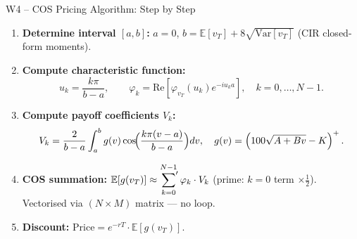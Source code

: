 \documentclass[aspectratio=169, 11pt]{beamer}
\begin{document}
\begin{frame}{W4 -- COS Pricing Algorithm: Step by Step}
\begin{enumerate}
  \item \textbf{Determine interval $[a,b]$:}\;
    $a=0$,\; $b=\mathbb{E}[v_T]+8\sqrt{\mathrm{Var}[v_T]}$ \;(CIR closed-form moments).

  \item \textbf{Compute characteristic function:}
    \[
  u_k=\frac{k\pi}{b-a},
  \qquad
  \varphi_k
  =
  \mathrm{Re}\!\left[
  \varphi_{v_T}(u_k)e^{-iu_ka}
  \right],
  \quad k=0,\dots,N-1.
    \]

  \item \textbf{Compute payoff coefficients $V_k$:}
    \[
      V_k = \frac{2}{b-a}\int_a^b g(v)\cos\!\Bigl(\frac{k\pi(v-a)}{b-a}\Bigr)dv,
      \quad g(v)=\left(100\sqrt{A+Bv}-K\right)^+.
    \]

  \item \textbf{COS summation:}
    $\displaystyle\mathbb{E}[g(v_T)] \approx \sideset{}{'}\sum_{k=0}^{N-1} \varphi_k \cdot V_k$
    \;(prime: $k\!=\!0$ term $\times\tfrac{1}{2}$).\\
    Vectorised via $(N\!\times\!M)$ matrix --- no loop.

  \item \textbf{Discount:}\; $\mathrm{Price} = e^{-rT}\cdot\mathbb{E}[g(v_T)]$.
\end{enumerate}
\end{frame}
\end{document}
